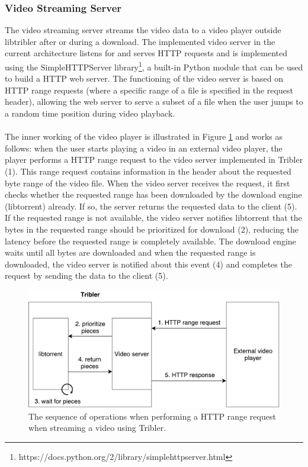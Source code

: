 \subsubsection{\textbf{Video Streaming Server}}
\label{subsubsec:video-server}
The video streaming server streams the video data to a video player outside libtribler after or during a download. The implemented video server in the current architecture listens for and serves HTTP requests and is implemented using the SimpleHTTPServer library\footnote{https://docs.python.org/2/library/simplehttpserver.html}, a built-in Python module that can be used to build a HTTP web server. The functioning of the video server is based on HTTP range requests (where a specific range of a file is specified in the request header), allowing the web server to serve a subset of a file when the user jumps to a random time position during video playback.\\\\
The inner working of the video player is illustrated in Figure \ref{fig:video-server} and works as follows: when the user starts playing a video in an external video player, the player performs a HTTP range request to the video server implemented in Tribler (1). This range request contains information in the header about the requested byte range of the video file. When the video server receives the request, it first checks whether the requested range has been downloaded by the download engine (libtorrent) already. If so, the server returns the requested data to the client (5). If the requested range is not available, the video server notifies libtorrent that the bytes in the requested range should be prioritized for download (2), reducing the latency before the requested range is completely available. The download engine waits until all bytes are downloaded and when the requested range is downloaded, the video server is notified about this event (4) and  completes the request by sending the data to the client (5).\\

\begin{figure}[h!]
	\centering
	\includegraphics[width=0.7\columnwidth]{images/architecture/video_server}
	\caption{The sequence of operations when performing a HTTP range request when streaming a video using Tribler.}
	\label{fig:video-server}
\end{figure}

